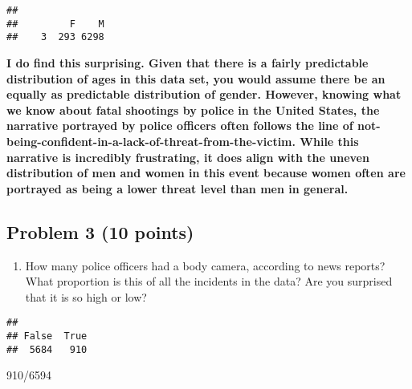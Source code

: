 \documentclass[
]{article}
\newenvironment{Shaded}{\begin{snugshade}}{\end{snugshade}}
\newcommand{\DecValTok}[1]{\textcolor[rgb]{0.00,0.00,0.81}{#1}}
\newcommand{\FunctionTok}[1]{\textcolor[rgb]{0.00,0.00,0.00}{#1}}
\newcommand{\NormalTok}[1]{#1}
\newcommand{\SpecialCharTok}[1]{\textcolor[rgb]{0.00,0.00,0.00}{#1}}
\providecommand{\tightlist}{%
  \setlength{\itemsep}{0pt}\setlength{\parskip}{0pt}}
\begin{document}
\begin{Shaded}
\end{Shaded}

\begin{verbatim}
## 
##         F    M 
##    3  293 6298
\end{verbatim}

\textbf{I do find this surprising. Given that there is a fairly
predictable distribution of ages in this data set, you would assume
there be an equally as predictable distribution of gender. However,
knowing what we know about fatal shootings by police in the United
States, the narrative portrayed by police officers often follows the
line of not-being-confident-in-a-lack-of-threat-from-the-victim. While
this narrative is incredibly frustrating, it does align with the uneven
distribution of men and women in this event because women often are
portrayed as being a lower threat level than men in general.}

\hypertarget{problem-3-10-points}{%
\subsection{Problem 3 (10 points)}\label{problem-3-10-points}}

\begin{enumerate}
\def\labelenumi{\alph{enumi}.}
\tightlist
\item
  How many police officers had a body camera, according to news reports?
  What proportion is this of all the incidents in the data? Are you
  surprised that it is so high or low?
\end{enumerate}

\begin{Shaded}
\end{Shaded}

\begin{verbatim}
## 
## False  True 
##  5684   910
\end{verbatim}

\begin{Shaded}
\begin{Highlighting}[]
\DecValTok{910}\SpecialCharTok{/}\DecValTok{6594}
\end{Highlighting}
\end{Shaded}
\end{document}
